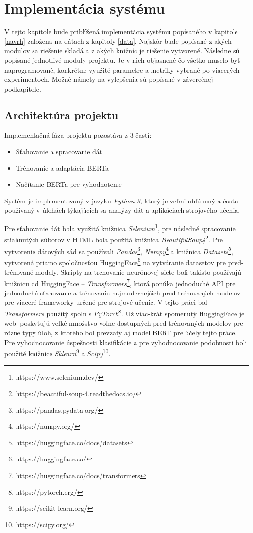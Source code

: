 \chapter{Implementácia systému}
\label{implementacia}
V tejto kapitole bude priblížená implementácia systému popísaného v kapitole \ref{navrh} založená na dátach z kapitoly \ref{data}. Najskôr bude popísané z akých modulov sa riešenie skladá a z akých knižníc je riešenie vytvorené. Následne sú popísané jednotlivé moduly projektu. Je v nich objasnené čo všetko muselo byť naprogramované, konkrétne využité parametre a metriky vybrané po viacerých experimentoch. Možné námety na vylepšenia sú popísané v záverečnej podkapitole.  

\section{Architektúra projektu}

Implementačná fáza projektu pozostáva z 3 častí: 
\begin{itemize}
    \item Sťahovanie a spracovanie dát
    \item Trénovanie a adaptácia BERTa
    \item Načítanie BERTa pre vyhodnotenie
\end{itemize} 

Systém je implementovaný v jazyku \textit{Python 3}, ktorý je veľmi obľúbený a často používaný v úlohách týkajúcich sa analýzy dát a aplikáciach strojového učenia. 

Pre sťahovanie dát bola využitá knižnica \textit{Selenium}\footnote{https://www.selenium.dev/}, pre následné spracovanie stiahnutých súborov v HTML bola použitá knižnica  \textit{BeautifulSoup4}\footnote{https://beautiful-soup-4.readthedocs.io/}. Pre vytvorenie dátových sád sa používali \textit{Pandas}\footnote{https://pandas.pydata.org/}, \textit{Numpy}\footnote{https://numpy.org/} a knižnica \textit{Datasets}\footnote{https://huggingface.co/docs/datasets}, vytvorená priamo spoločnosťou HuggingFace\footnote{https://huggingface.co/} na vytváranie datasetov pre pred-trénované modely. Skripty na trénovanie neurónovej siete boli takisto používajú knižnicu od HuggingFace -- \textit{Transformers}\footnote{https://huggingface.co/docs/transformers}, ktorá ponúka jednoduché API pre jednoduché sťahovanie a trénovanie najmodernejších pred-trénovaných modelov pre viaceré frameworky určené pre strojové učenie. V tejto práci bol \textit{Transformers} použitý spolu s \textit{PyTorch}\footnote{https://pytorch.org/}. Už viac-krát spomenutý HuggingFace je web, poskytujú veľké množstvo voľne dostupných pred-trénovaných modelov pre rôzne typy úloh, z ktorého bol prevzatý aj model BERT pre účely tejto práce. Pre vyhodnocovanie úspešnosti klasifikácie a pre vyhodnocovanie podobnosti boli použité knižnice \textit{Sklearn}\footnote{https://scikit-learn.org/} a \textit{Scipy}\footnote{https://scipy.org/}.
 
